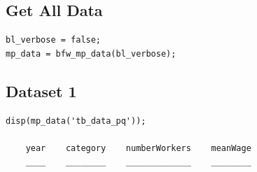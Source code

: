 \documentclass[
]{book}
\begin{document}
\hypertarget{get-all-data}{%
\subsection{Get All Data}\label{get-all-data}}

\begin{verbatim}
bl_verbose = false;
mp_data = bfw_mp_data(bl_verbose);
\end{verbatim}

\hypertarget{dataset-1}{%
\subsection{Dataset 1}\label{dataset-1}}

\begin{verbatim}
disp(mp_data('tb_data_pq'));

    year    category    numberWorkers    meanWage
    ____    ________    _____________    ________


\end{verbatim}
\end{document}
